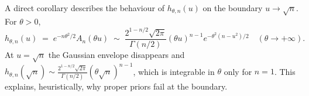 \documentclass{article}%
\newcommand{\1}{\mathbf{1}}
\begin{document}
A direct corollary describes the behaviour of \(h_{\theta,n}(u)\) on
the boundary \(u\to\sqrt n\). For \(\theta>0\),
\begin{equation}\label{eq:h-asymp}
  h_{\theta,n}(u)\;=\;e^{-n\theta^2/2}A_n(\theta u)
  \;\sim\;\frac{2^{1-n/2}\sqrt{2\pi}}{\Gamma(n/2)}
   (\theta u)^{n-1}e^{-\theta^2(n-u^2)/2}
   \quad (\theta\to+\infty).
\end{equation}
At \(u=\sqrt n\) the Gaussian envelope disappears and
\(h_{\theta,n}(\sqrt n)\sim \frac{2^{1-n/2}\sqrt{2\pi}}{\Gamma(n/2)}
(\theta\sqrt n)^{n-1}\), which is integrable in \(\theta\) only for
\(n=1\). This explains, heuristically, why proper priors fail at the
boundary.
\end{document}
